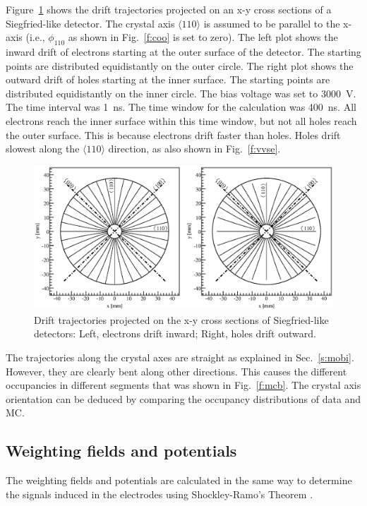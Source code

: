 \documentclass[epj]{svjour}
\begin{document}
Figure~\ref{f:trjs} shows the drift trajectories projected on an
x-y cross sections of a Siegfried-like detector. The crystal axis
$\langle 110 \rangle$ is assumed to be parallel to the x-axis
(i.e., $\phi_{110}$ as shown in Fig.~\ref{f:coo} is set
to zero). The left plot shows the inward drift of electrons starting
at the outer surface of the detector. The starting points are
distributed equidistantly on the outer circle.  The right plot shows
the outward drift of holes starting at the inner surface.  The
starting points are distributed equidistantly on the inner circle.
The bias voltage was set to 3000~V. The time interval was 1~ns.  The
time window for the calculation was 400~ns.  All electrons reach the
inner surface within this time window, but not all holes reach the
outer surface.  This is because electrons drift faster than holes.
Holes drift slowest along the $\langle 110 \rangle$ direction, as also
shown in Fig.~\ref{f:vvse}.
\begin{figure}\centering
\includegraphics[width=0.8\linewidth]{trjs} 
\caption{Drift trajectories projected on the x-y cross sections of
Siegfried-like detectors: Left, electrons drift inward; Right, holes
drift outward.}
\label{f:trjs} 
\end{figure} 
 
The trajectories along the crystal axes are straight as explained in
Sec.~\ref{s:mobi}.  However, they are clearly bent along other
directions.  This causes the different occupancies in different
segments that was shown in Fig.~\ref{f:mcb}.  The crystal axis
orientation can be deduced by comparing the occupancy distributions of
data and MC. 
 
\subsection{Weighting fields and potentials}
\label{s:wei}
The weighting fields and potentials are calculated in the same way to
determine the signals induced in the electrodes using Shockley-Ramo's
Theorem \cite{Gat82,Rad88,He00}.
\end{document}
